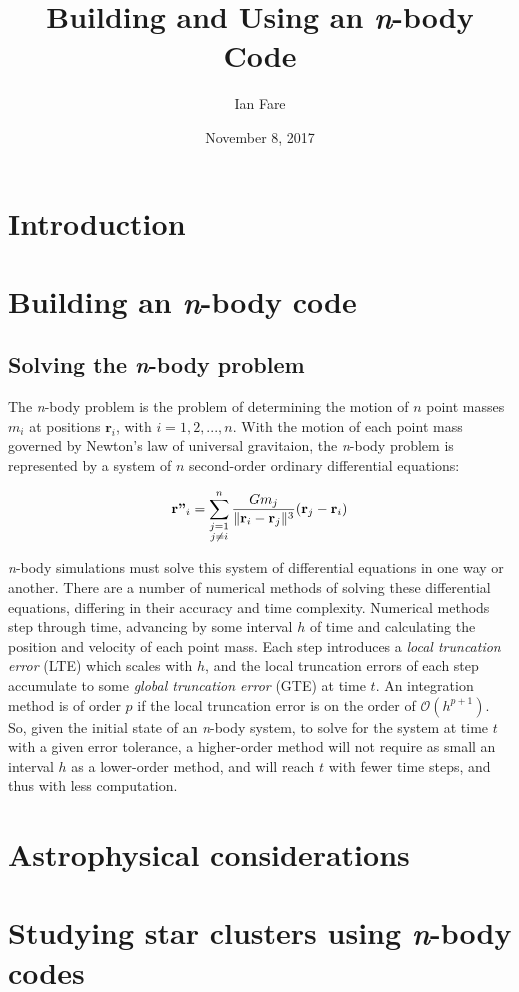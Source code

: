 \documentclass{article}
\title{Building and Using an \textit{n}-body Code}
\author{Ian Fare}
\date{November 8, 2017}
\DeclarePairedDelimiter{\norm}{\lVert}{\rVert}
\begin{document}
\maketitle

\section{Introduction}

\section{Building an \textit{n}-body code}

\subsection{Solving the \textit{n}-body problem}

The \textit{n}-body problem is the problem of determining the motion of $n$ point masses $m_i$ at positions $\textbf{r}_i$, with $i=1,2,...,n$. With the motion of each point mass governed by Newton's law of universal gravitaion, the \textit{n}-body problem is represented by a system of $n$ second-order ordinary differential equations:

\begin{equation}
    \textbf{r''}_i = \sum_{\substack{j=1\\j\neq i}}^n \frac{Gm_j}{\norm{\textbf{r}_i-\textbf{r}_j}^3}(\textbf{r}_j-\textbf{r}_i)
\end{equation}

\textit{n}-body simulations must solve this system of differential equations in one way or another. There are a number of numerical methods of solving these differential equations, differing in their accuracy and time complexity. Numerical methods step through time, advancing by some interval $h$ of time and calculating the position and velocity of each point mass. Each step introduces a \textit{local truncation error} (LTE) which scales with $h$, and the local truncation errors of each step accumulate to some \textit{global truncation error} (GTE) at time $t$. An integration method is of order $p$ if the local truncation error is on the order of $\mathcal{O}(h^{p+1})$. So, given the initial state of an \textit{n}-body system, to solve for the system at time $t$ with a given error tolerance, a higher-order method will not require as small an interval $h$ as a lower-order method, and will reach $t$ with fewer time steps, and thus with less computation. 




\section{Astrophysical considerations}

\section{Studying star clusters using \textit{n}-body codes}





\end{document}
